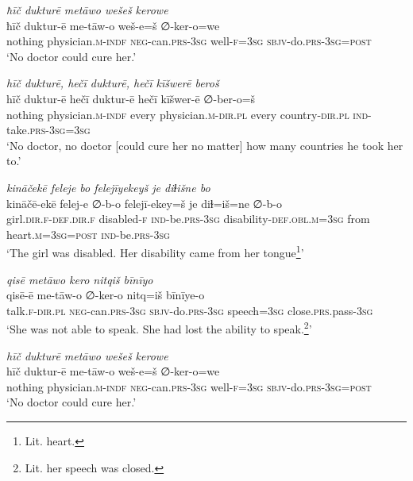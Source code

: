 \ea \label{ŽP.147}
\textit{ħīč dukturē metāwo wešeš kerowe} \\ 
\gll ħīč duktur-ē me-tāw-o weš-e=š ∅-ker-o=we \\ 
 nothing physician\textsc{.m}\textsc{-indf} \textsc{neg-}can\textsc{.prs}\textsc{-3sg} well\textsc{-f}\textsc{=3sg} \textsc{sbjv-}do\textsc{.prs}\textsc{-3sg}\textsc{=\textsc{post}} \\ 
\glt `No doctor could cure her.'
\z 
 
\ea \label{ŽP.148}
\textit{hīč dukturē, hečī dukturē, hečī kīšwerē beroš} \\ 
\gll hīč duktur-ē hečī duktur-ē hečī kīšwer-ē ∅-ber-o=š \\ 
 nothing physician\textsc{.m}\textsc{-indf} every physician\textsc{.m}\textsc{-dir}\textsc{.pl} every country\textsc{-dir}\textsc{.pl} \textsc{ind-}take\textsc{.prs}\textsc{-3sg}\textsc{=3sg} \\ 
\glt `No doctor, no doctor [could cure her no matter] how many countries he took her to.'
\z 
 
\ea \label{ŽP.149}
\textit{kināčekē feleje bo felejīyekeyš je diɫišne bo} \\ 
\gll kināčē-ekē felej-e ∅-b-o felejī-ekey=š je diɫ=iš=ne ∅-b-o \\ 
 girl\textsc{.dir}\textsc{.f}\textsc{-def}\textsc{.dir}\textsc{.f} disabled\textsc{-f} \textsc{ind-}be\textsc{.prs}\textsc{-3sg} disability\textsc{-def}\textsc{.obl}\textsc{.m}\textsc{=3sg} from heart\textsc{.m}\textsc{=3sg}\textsc{=\textsc{post}} \textsc{ind-}be\textsc{.prs}\textsc{-3sg} \\ 
\glt `The girl was disabled. Her disability came from her tongue\footnote{Lit. heart.}'
\z 
 
\ea \label{ŽP.150}
\textit{qisē metāwo kero nitqiš bīnīyo} \\ 
\gll qisē-ē me-tāw-o ∅-ker-o nitq=iš bīnīye-o \\ 
 talk\textsc{.f}\textsc{-dir}\textsc{.pl} \textsc{neg-}can\textsc{.prs}\textsc{-3sg} \textsc{sbjv-}do\textsc{.prs}\textsc{-3sg} speech\textsc{=3sg} close\textsc{.prs}.pass\textsc{-3sg} \\ 
\glt `She was not able to speak. She had lost the ability to speak.\footnote{Lit. her speech was closed.}'
\z 
 
\ea \label{ŽP.152}
\textit{hīč dukturē metāwo wešeš kerowe} \\ 
\gll hīč duktur-ē me-tāw-o weš-e=š ∅-ker-o=we \\ 
 nothing physician\textsc{.m}\textsc{-indf} \textsc{neg-}can\textsc{.prs}\textsc{-3sg} well\textsc{-f}\textsc{=3sg} \textsc{sbjv-}do\textsc{.prs}\textsc{-3sg}\textsc{=\textsc{post}} \\ 
\glt `No doctor could cure her.'
\z 
 
